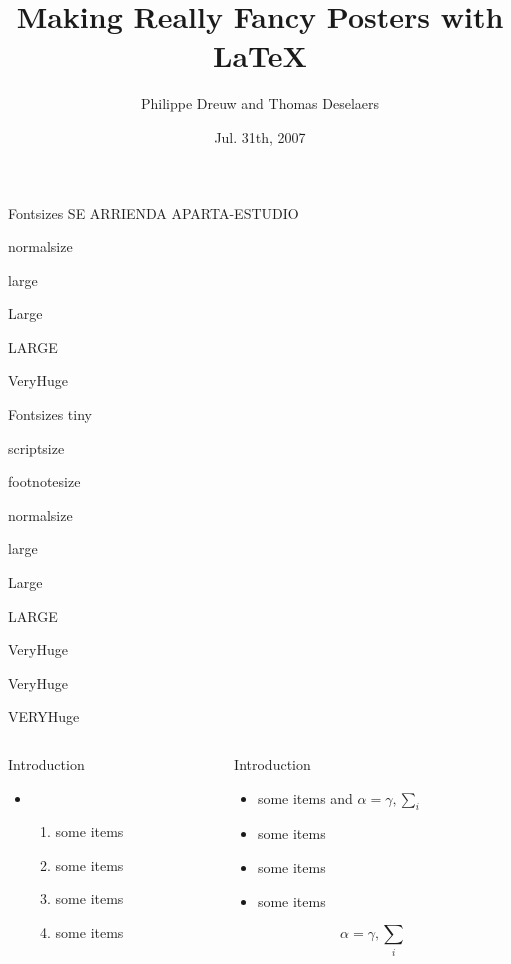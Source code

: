 \documentclass[final]{beamer}
\title[Fancy Posters]{Making Really Fancy Posters with \LaTeX}
\author[Dreuw \& Deselaers]{Philippe Dreuw and Thomas Deselaers}
\institute[RWTH Aachen University]{Human Language Technology and Pattern Recognition,RWTH Aachen University}
\date{Jul. 31th, 2007}
\begin{document}
  \begin{frame}{} 
    \vfill
    \begin{block}{\large Fontsizes}
      \centering
      {\VeryHuge SE ARRIENDA APARTA-ESTUDIO}\par
      {\normalsize normalsize}\par
      {\large large}\par
      {\Large Large}\par
      {\LARGE LARGE}\par
      {\veryHuge VeryHuge}\par

    \end{block}
    \vfill
    \vfill
    \begin{block}{\large Fontsizes}
      \centering
      {\tiny tiny}\par
      {\scriptsize scriptsize}\par
      {\footnotesize footnotesize}\par
      {\normalsize normalsize}\par
      {\large large}\par
      {\Large Large}\par
      {\LARGE LARGE}\par
      {\veryHuge VeryHuge}\par
      {\VeryHuge VeryHuge}\par
      {\VERYHuge VERYHuge}\par
    \end{block}
    \vfill
    \begin{columns}[t]
      \begin{column}{.48\linewidth}
        \begin{block}{Introduction}

          \begin{itemize}
          \item[]
            \begin{enumerate}
            \item some items
            \item some items
            \item some items
            \item some items
            \end{enumerate}    
          \end{itemize}
        \end{block}
      \end{column}
      \begin{column}{.48\linewidth}
        \begin{block}{Introduction}
          \begin{itemize}
          \item some items and $\alpha=\gamma, \sum_{i}$
          \item some items
          \item some items
          \item some items
          \end{itemize}
          $$\alpha=\gamma, \sum_{i}$$
        \end{block}


\end{column}
\end{columns}
\end{frame}
\end{document}
